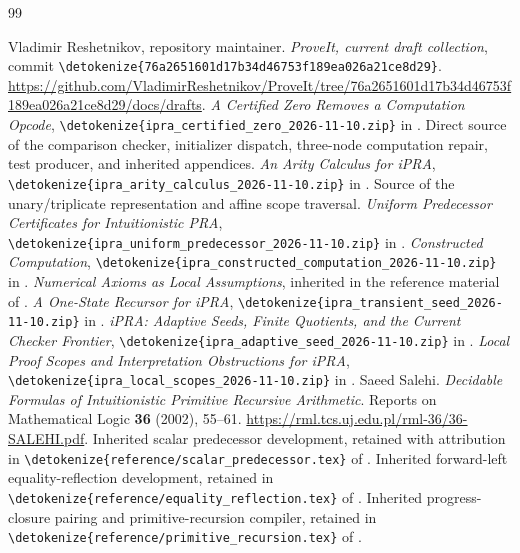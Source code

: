 \documentclass[11pt,letterpaper]{article}
\theoremstyle{definition}\newtheorem{definition}[theorem]{Definition}
\theoremstyle{remark}\newtheorem{remark}[theorem]{Remark}
\newcommand{\file}[1]{\expandafter\nolinkurl\expandafter{\detokenize{#1}}}
\begin{document}
\clearpage
\begin{thebibliography}{99}
\raggedright
{}
Vladimir Reshetnikov, repository maintainer.
\emph{ProveIt, current draft collection}, commit
\file{76a2651601d17b34d46753f189ea026a21ce8d29}.
\url{https://github.com/VladimirReshetnikov/ProveIt/tree/76a2651601d17b34d46753f189ea026a21ce8d29/docs/drafts}.
\emph{A Certified Zero Removes a Computation Opcode},
\file{ipra_certified_zero_2026-11-10.zip} in \cite{corpus}.
Direct source of the comparison checker, initializer dispatch,
three-node computation repair, test producer, and inherited appendices.
\emph{An Arity Calculus for iPRA},
\file{ipra_arity_calculus_2026-11-10.zip} in \cite{corpus}.
Source of the unary/triplicate representation and affine scope traversal.
\emph{Uniform Predecessor Certificates for Intuitionistic PRA},
\file{ipra_uniform_predecessor_2026-11-10.zip} in \cite{corpus}.
\emph{Constructed Computation},
\file{ipra_constructed_computation_2026-11-10.zip} in \cite{corpus}.
\emph{Numerical Axioms as Local Assumptions}, inherited in the reference
material of \cite{arity,constructed}.
\emph{A One-State Recursor for iPRA},
\file{ipra_transient_seed_2026-11-10.zip} in \cite{corpus}.
\emph{iPRA: Adaptive Seeds, Finite Quotients, and the Current Checker Frontier},
\file{ipra_adaptive_seed_2026-11-10.zip} in \cite{corpus}.
\emph{Local Proof Scopes and Interpretation Obstructions for iPRA},
\file{ipra_local_scopes_2026-11-10.zip} in \cite{corpus}.
Saeed Salehi. \emph{Decidable Formulas of Intuitionistic Primitive
Recursive Arithmetic}. Reports on Mathematical Logic \textbf{36}
(2002), 55--61.
\url{https://rml.tcs.uj.edu.pl/rml-36/36-SALEHI.pdf}.
Inherited scalar predecessor development, retained with attribution in
\file{reference/scalar_predecessor.tex} of \cite{certified}.
Inherited forward-left equality-reflection development, retained in
\file{reference/equality_reflection.tex} of \cite{certified}.
Inherited progress-closure pairing and primitive-recursion compiler,
retained in \file{reference/primitive_recursion.tex} of \cite{certified}.
\end{thebibliography}
\end{document}
